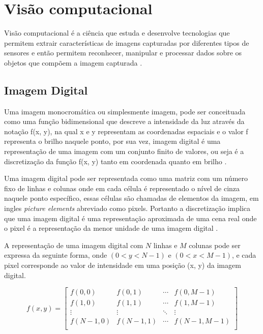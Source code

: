 \section[Visão computacional]{Visão computacional}
Visão computacional é a ciência que estuda e desenvolve tecnologias que permitem extrair características de imagens capturadas por diferentes tipos de sensores e então permitem reconhecer, manipular e processar dados sobre os objetos que compõem a imagem capturada \cite{VisaoComp}.

\subsection[Imagem Digital]{Imagem Digital}

Uma imagem monocromática ou simplesmente imagem,  pode ser conceituada como uma função bidimensional que descreve a intensidade da luz através da notação f(x, y), na qual x e y representam as coordenadas espaciais e o valor f representa  o brilho naquele ponto, por sua vez, imagem digital é uma representação de uma imagem com um conjunto finito de valores, ou seja é a discretização da função f(x, y) tanto em coordenada quanto em brilho \cite{imagemMonocromatica}.

Uma imagem digital pode ser representada como uma matriz com um número fixo de linhas e colunas onde em cada célula é representado o nível de cinza naquele ponto específico, essas células são chamadas de elementos da imagem, em ingles \textit{picture elements} abreviado como pixels. Portanto a discretização implica que uma imagem digital é uma representação aproximada de uma cena real onde o pixel é a representação da menor unidade de uma imagem digital \cite{imagemMonocromatica}. 

A representação de uma imagem digital com $N$ linhas e $M$ colunas pode ser expressa da seguinte forma, onde $(0 < y < N-1)$ e $(0 < x < M-1)$, e cada pixel corresponde ao valor de intensidade em uma posição (x, y) da imagem digital.

\[
    f(x, y) = \left[
        \begin{array}{cccc}
        f(0, 0) & f(0, 1) & \cdots & f(0, M-1) \\
        f(1, 0) & f(1, 1) & \cdots & f(1, M-1) \\
        \vdots & \vdots & \ddots & \vdots \\
        f(N-1, 0) & f(N-1, 1) & \cdots & f(N-1, M-1) \\
        \end{array}
    \right]
\]


